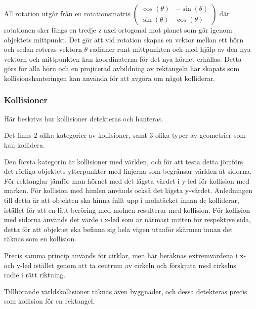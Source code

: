 \documentclass[12pt,a4paper]{article}
\newcounter{subsubsubsection}[subsubsection]
\begin{document}
All rotation utgår från en rotationsmatris 
\begin{math}
	\begin{pmatrix}
	\cos (\theta) & -\sin (\theta) \\
	\sin (\theta) & \cos (\theta)  
	\end{pmatrix}
\end{math}
där rotationen sker längs en tredje z axel ortogonal mot planet som går igenom objektets mittpunkt. Det gör att vid rotation skapas en vektor mellan ett hörn och sedan roteras vektorn $\theta$ radianer runt mittpunkten och med hjälp av den nya vektorn och mittpunkten kan koordinaterna för det nya hörnet erhållas. Detta görs för alla hörn och en projicerad avbildning av rektangeln har skapats som kollisionshanteringen kan använda för att avgöra om något kolliderar. \\


\subsubsection{Kollisioner}
Här beskrivs hur kollisioner detekteras och hanteras.


Det finns 2 olika kategorier av kollisioner, samt 3 olika typer av geometrier som kan kollidera.

Den första kategorin är kollisioner med världen, och för att testa detta jömförs det rörliga objektets ytterpunkter med linjerna som begränsar världen åt sidorna. För rektanglar jämför man hörnet med det lägsta värdet i y-led för kollision med marken. För kollision med himlen används också det lägsta y-värdet. Anledningen till detta är att objekten ska hinna fullt upp i molntäcket innan de kolliderar, istället för att en lätt beröring med molnen resulterar med kollision. För kollision med sidorna används det värde i x-led som är närmast mitten för respektive sida, detta för att objektet ska befinna sig hela vägen utanför skärmen innan det räknas som en kollision.

Precis samma princip används för cirklar, men här beräknas extremvärdena i x- och y-led istället genom att ta centrum av cirkeln och förskjuta med cirkelns radie i rätt riktning.

Tillhörande världskollisioner räknas även byggnader, och dessa detekteras precis som kollision för en rektangel.

\vspace{0.2cm}
\end{document}
